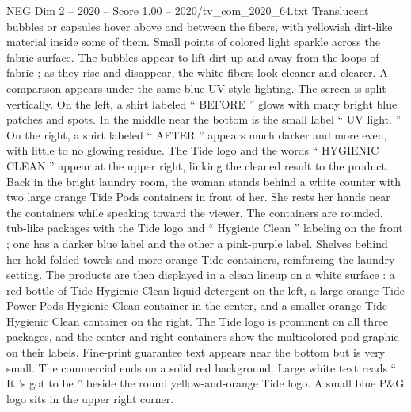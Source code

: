 \begin{textsample}{NEG Dim 2 – 2020 – Score 1.00 – 2020/tv\_com\_2020\_64.txt}
Translucent bubbles or capsules hover above and between the fibers, with yellowish dirt-like material inside some of them.
Small points of colored light sparkle across the fabric surface.
The bubbles appear to lift dirt up and away from the loops of fabric ; as they rise and disappear, the white fibers look cleaner and clearer.
A comparison appears under the same blue UV-style lighting.
The screen is split vertically.
On the left, a shirt labeled “ BEFORE ” glows with many bright blue patches and spots.
In the middle near the bottom is the small label “ UV light. ” On the right, a shirt labeled “ AFTER ” appears much darker and more even, with little to no glowing residue.
The Tide logo and the words “ HYGIENIC CLEAN ” appear at the upper right, linking the cleaned result to the product.
Back in the bright laundry room, the woman stands behind a white counter with two large orange Tide Pods containers in front of her.
She rests her hands near the containers while speaking toward the viewer.
The containers are rounded, tub-like packages with the Tide logo and “ Hygienic Clean ” labeling on the front ; one has a darker blue label and the other a pink-purple label.
Shelves behind her hold folded towels and more orange Tide containers, reinforcing the laundry setting.
The products are then displayed in a clean lineup on a white surface : a red bottle of Tide Hygienic Clean liquid detergent on the left, a large orange Tide Power Pods Hygienic Clean container in the center, and a smaller orange Tide Hygienic Clean container on the right.
The Tide logo is prominent on all three packages, and the center and right containers show the multicolored pod graphic on their labels.
Fine-print guarantee text appears near the bottom but is very small.
The commercial ends on a solid red background.
Large white text reads “ It ’s got to be ” beside the round yellow-and-orange Tide logo.
A small blue P\&G logo sits in the upper right corner.

\end{textsample}
